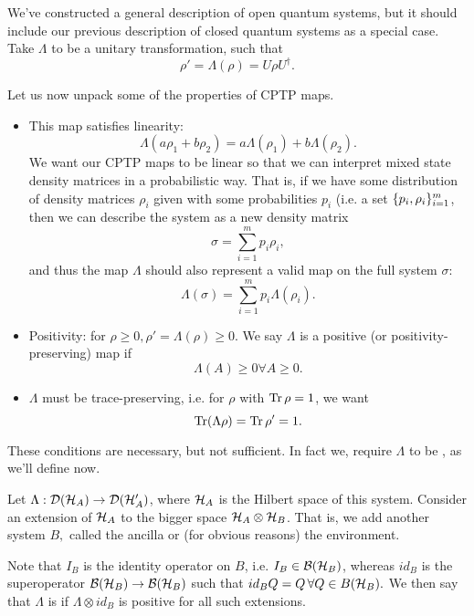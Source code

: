 \begin{exm}
    We've constructed a general description of open quantum systems, but it should include our previous description of closed quantum systems as a special case. Take $\Lambda$ to be a unitary transformation, such that
    \begin{equation}
        \rho'=\Lambda(\rho)=U\rho U^\dagger.
    \end{equation}
    
    
\end{exm}
Let us now unpack some of the properties of CPTP maps.
\begin{itemize}
    \item This map satisfies linearity:
    \begin{equation*}
        \Lambda(a\rho_1 +b\rho_2) = a\Lambda(\rho_1) + b\Lambda(\rho_2).
    \end{equation*}
    We want our CPTP maps to be linear so that we can interpret mixed state density matrices in a probabilistic way. That is, if we have some distribution of density matrices $\rho_i$ given with some probabilities $p_i$ (i.e. a set $\{p_i,\rho_i\}_{i=1}^m$, then we can describe the system as a new density matrix
    \begin{equation*}
        \sigma=\sum_{i=1}^m p_i \rho_i,
    \end{equation*}
    and thus the map $\Lambda$ should also represent a valid map on the full system $\sigma$:
    \begin{equation*}
        \Lambda(\sigma)=\sum_{i=1}^m p_i \Lambda(\rho_i).
    \end{equation*}
    \item Positivity: for $\rho\geq 0, \rho' = \Lambda(\rho) \geq 0$. We say $\Lambda$ is a positive (or positivity-preserving) map if
    \begin{equation}
        \Lambda(A)\geq 0 \forall A \geq 0.
    \end{equation}
    \item $\Lambda$ must be trace-preserving, i.e. for $\rho$ with $\operatorname{Tr} \rho =1$, we want 
    \begin{equation}
        \operatorname{Tr} (\Lambda \rho)=\operatorname{Tr} \rho'=1.
    \end{equation}
\end{itemize}
These conditions are necessary, but not sufficient. In fact we, require $\Lambda$ to be , as we'll define now. 
\begin{defn}
    Let $\Lambda:\mathcal{D}(\mathcal H_A)\to \mathcal{D}(\mathcal H_A')$, where $\mathcal H_A$ is the Hilbert space of this system. Consider an extension of $\mathcal H_A$ to the bigger space $\mathcal H_A \otimes \mathcal H_B$. That is, we add another system $B,$ called the ancilla or (for obvious reasons) the environment. 

    Note that $I_B$ is the identity operator on $B$, i.e. $I_B\in \mathcal{B}(\mathcal H_B)$, whereas $id_B$ is the superoperator $\mathcal{B}(\mathcal H_B)\to \mathcal{B}(\mathcal H_B)$ such that $id_B Q=Q \,\forall Q\in B(\mathcal H_B).$ We then say that $\Lambda$ is  if $\Lambda \otimes id_B$ is positive for all such extensions.
\end{defn}
